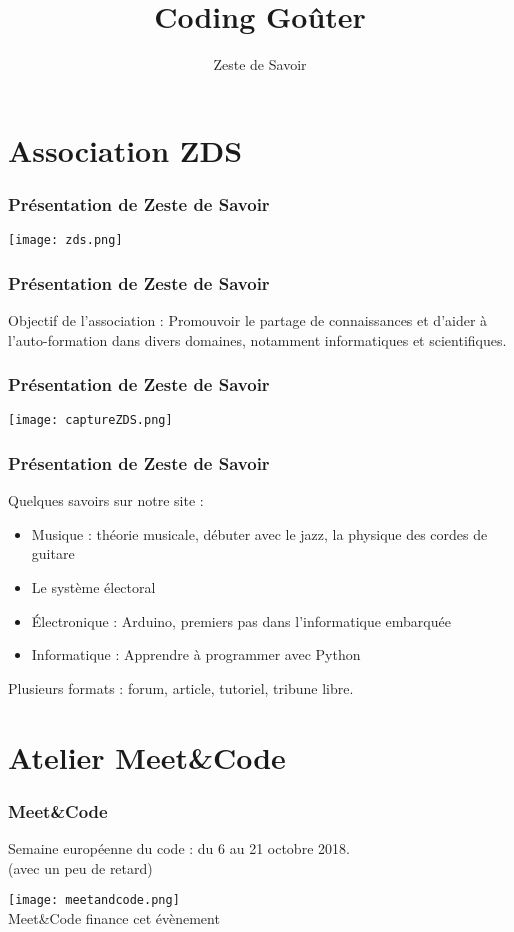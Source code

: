 \documentclass{beamer}
\title{Coding Goûter}
\author{Zeste de Savoir}
\begin{document}
\begin{frame}
  \titlepage
\end{frame}

\section{Association ZDS}

\begin{frame}
  \frametitle{Présentation de Zeste de Savoir}
  \begin{center}
        \texttt{[image: zds.png]}
    \end{center}
\end{frame}

\begin{frame}
    \frametitle{Présentation de Zeste de Savoir}
    Objectif de l'association : Promouvoir le partage de connaissances et d’aider à l’auto-formation dans divers domaines, notamment informatiques et scientifiques.
\end{frame}

\begin{frame}
    \frametitle{Présentation de Zeste de Savoir}
    \begin{center}
        \texttt{[image: captureZDS.png]}
    \end{center}
\end{frame}

\begin{frame}
    \frametitle{Présentation de Zeste de Savoir}
    Quelques savoirs sur notre site :
    \begin{itemize}
        \item Musique : théorie musicale, débuter avec le jazz, la physique des cordes de guitare
        \item Le système électoral
        \item Électronique : Arduino, premiers pas dans l'informatique embarquée
        \item Informatique : Apprendre à programmer avec Python
    \end{itemize}
    Plusieurs formats : forum, article, tutoriel, tribune libre.
\end{frame}

\section{Atelier Meet\&Code}

\begin{frame}
    \frametitle{Meet\&Code}
    Semaine européenne du code : du 6 au 21 octobre 2018.
    \\(avec un peu de retard)
    \begin{center}
        \texttt{[image: meetandcode.png]}
        \\Meet\&Code finance cet évènement
    \end{center}
\end{frame}
\end{document}
